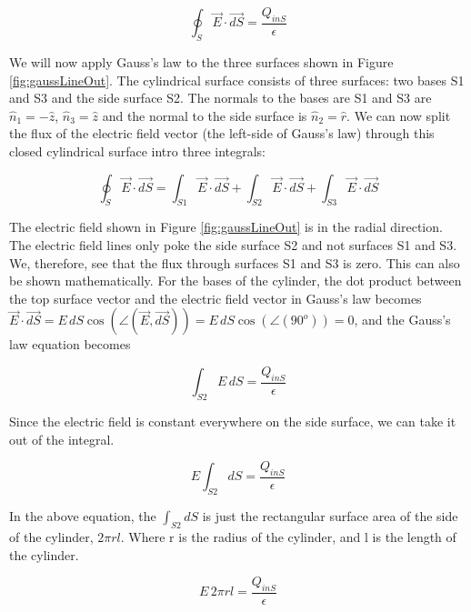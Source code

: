 \documentclass{ximera}
\begin{document}
\begin{equation}
\oint_S \vec{E} \cdot \vec{dS} = \frac{Q_{inS}}{\epsilon}
\end{equation}


We will now apply Gauss's law to the three surfaces shown in Figure  \ref{fig:gaussLineOut}. The cylindrical surface consists of three surfaces: two bases S1 and S3 and the side surface S2. The normals to the bases are S1 and S3 are $\hat{n}_1=-\hat{z}$, $\hat{n}_3=\hat{z}$ and the normal to the side surface is  $\hat{n}_2=\hat{r}$. We can now split the flux of the electric field vector (the left-side of Gauss's law) through this closed cylindrical surface  intro three integrals:


 
\begin{equation}
\oint_S \vec{E} \cdot \vec{dS} = \int_{S1}  \vec{E} \cdot \vec{dS} +\int_{S2}  \vec{E} \cdot \vec{dS}+\int_{S3}  \vec{E} \cdot \vec{dS}
\end{equation}
 
 The electric field shown in Figure \ref{fig:gaussLineOut} is in the radial direction. The electric field lines only poke the side surface S2 and not surfaces S1 and S3. We, therefore, see that the flux through surfaces S1 and S3 is zero. This can also be shown mathematically. For the bases of the cylinder, the dot product between the top surface vector and the electric field vector in Gauss's law becomes $\vec{E} \cdot \vec{dS}= E \,dS  \cos(\angle(\vec{E},\vec{dS}))= E \,dS  \cos(\angle(90^o)) = 0$, and the Gauss's law equation becomes 

\begin{equation}
\int_{S2} E \,dS  = \frac{Q_{inS}}{\epsilon}
\end{equation}

Since the electric field is constant everywhere on the side surface, we can take it out of the integral. 


\begin{equation}
 E \int_{S2} dS = \frac{Q_{inS}}{\epsilon}
\end{equation}

In the above equation, the $\int_{S2} dS $ is just the rectangular surface area of the side of the cylinder, $2 \pi r l$. Where r is the radius of the cylinder, and l is the length of the cylinder.



\begin{equation}
 E \, 2 \pi r l = \frac{Q_{inS}}{\epsilon}
\end{equation}
\end{document}
